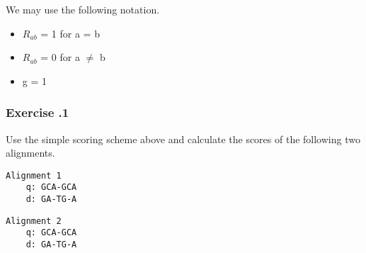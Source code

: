 \noindent
We may use the following notation.
\begin{itemize}
\item $R_{ab}$ = 1 for a = b
\item $R_{ab}$ = 0 for a $\neq$ b
\item g = 1
\end{itemize}

%
%
\newpage 

%
%
\subsubsection*{Exercise \thesection.1}
Use the simple scoring scheme above and calculate the scores of the following two alignments.

\begin{multicols}{2}
\begin{verbatim}
Alignment 1
    q: GCA-GCA
    d: GA-TG-A	
\end{verbatim}

\begin{verbatim}
Alignment 2 
    q: GCA-GCA
    d: GA-TG-A	
\end{verbatim}
\end{multicols}

%
